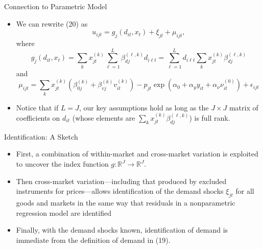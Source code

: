 \documentclass[aspectratio=169]{beamer}  %
\begin{document}
\begin{frame}{Connection to Parametric Model}
    \begin{itemize}
    \item We can rewrite (20) as 
    \begin{equation}
        u_{ijt} = g_j(d_{it}, x_t) + \xi_{jt} + \mu_{ijt},
    \end{equation}
    where
    \begin{equation}
        g_j(d_{it}, x_t) = \sum_k x_{jt}^{(k)} \sum_{\ell=1}^L \beta_{dj}^{(\ell, k)} d_{i\ell t} = \sum_{\ell=1}^L d_{i\ell t} \sum_k x_{jt}^{(k)} \beta_{dj}^{(\ell, k)}
    \end{equation}
    and
    \begin{equation}
        \mu_{ijt} = \sum_k x_{jt}^{(k)} \left( \beta_{0j}^{(k)} + \beta_{vj}^{(k)} v_{it}^{(k)} \right) - p_{jt} \exp(\alpha_0 + \alpha_y y_{it} + \alpha_\nu \nu_{it}^{(0)}) + \epsilon_{ijt}
    \end{equation}
    \item Notice that if \(L = J\), our key assumptions hold as long as the \(J \times J\) matrix of coefficients on \(d_{it}\) (whose elements are \(\sum_k x_{jt}^{(k)} \beta_{dj}^{(\ell, k)}\)) is full rank.
    \end{itemize}
\end{frame}

 
\begin{frame}{Identification: A Sketch}
    \begin{itemize}
    \item First, a combination of within-market and cross-market variation is exploited to uncover the index function \(g: \mathbb{R}^J \rightarrow \mathbb{R}^J\). 
    \item Then cross-market variation—including that produced by excluded instruments for prices—allows identification of the demand shocks \(\xi_{jt}\) for all goods and markets in the same way that residuals in a nonparametric regression
    model are identified
    \item Finally, with the demand shocks known, identification of demand is immediate from the definition of demand in (19).
    \end{itemize}
\end{frame}
 
\end{document}
